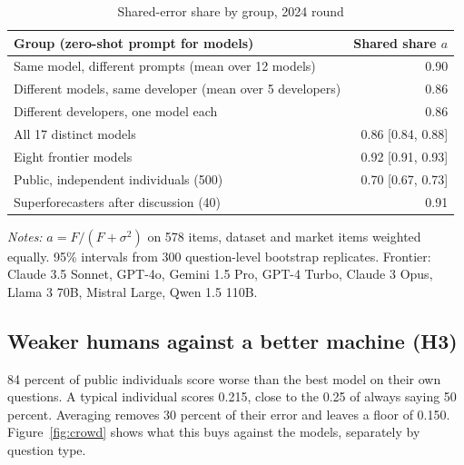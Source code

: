 \documentclass[11pt,a4paper]{article}
\theoremstyle{definition}
\begin{document}
\begin{table}[t]
\centering
\caption{Shared-error share by group, 2024 round}\label{tab:ladder}
\footnotesize
\begin{threeparttable}
\begin{tabularx}{0.82\textwidth}{Y r}
\toprule
Group (zero-shot prompt for models) & Shared share $a$ \\
\midrule
Same model, different prompts (mean over 12 models) & 0.90 \\
Different models, same developer (mean over 5 developers) & 0.86 \\
Different developers, one model each & 0.86 \\
All 17 distinct models & 0.86 [0.84, 0.88] \\
Eight frontier models & 0.92 [0.91, 0.93] \\
\addlinespace
Public, independent individuals (500) & 0.70 [0.67, 0.73] \\
Superforecasters after discussion (40) & 0.91 \\
\bottomrule
\end{tabularx}
\begin{tablenotes}\footnotesize
\item \emph{Notes:} $a=F/(F+\sigma^2)$ on 578 items, dataset and market items weighted equally. 95\% intervals from 300 question-level bootstrap replicates. Frontier: Claude 3.5 Sonnet, GPT-4o, Gemini 1.5 Pro, GPT-4 Turbo, Claude 3 Opus, Llama 3 70B, Mistral Large, Qwen 1.5 110B.
\end{tablenotes}
\end{threeparttable}
\end{table}

\subsection{Weaker humans against a better machine (H3)}\label{sec:h3}

84 percent of public individuals score worse than the best model on their own questions. A typical individual scores 0.215, close to the 0.25 of always saying 50 percent. Averaging removes 30 percent of their error and leaves a floor of 0.150. Figure~\ref{fig:crowd} shows what this buys against the models, separately by question type.
\end{document}
